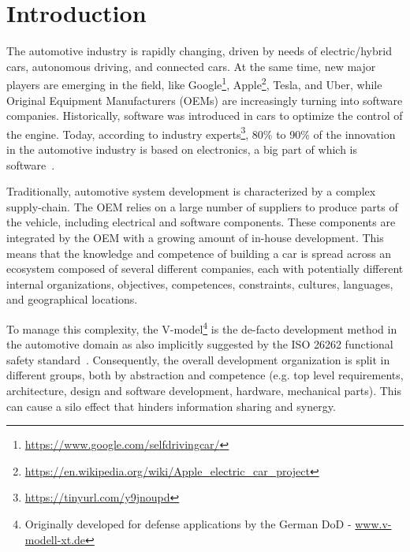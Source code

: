 \section{Introduction}\label{sec:intro}


The automotive industry is rapidly %
changing, driven by needs of 
electric/hybrid cars, autonomous driving, and connected cars. 
At the same time, new major players are emerging in the field, like Google\footnote{\url{https://www.google.com/selfdrivingcar/}},  %
Apple\footnote{\url{https://en.wikipedia.org/wiki/Apple_electric_car_project}}, %
 Tesla, and Uber, while Original Equipment Manufacturers (OEMs) are increasingly turning into software companies. 
Historically, software was introduced in cars to optimize the control of the engine. 
Today, according to industry experts\footnote{\url{https://tinyurl.com/y9jnoupd}}, 80\% to 90\% of the innovation in the automotive industry is based on electronics, a big part of which is software~\cite{ESEM2016}. 

Traditionally, automotive system development is characterized by a complex supply-chain.
The OEM relies on a large number of suppliers to produce parts of the vehicle, including electrical and software components.
These components are integrated by the OEM with a growing amount of in-house development.
This means that the knowledge and competence of building a car is spread across an ecosystem composed of several different companies, each with potentially different internal organizations, objectives, competences, constraints, cultures, languages, and geographical locations. 

To manage this complexity, the V-model\footnote{Originally developed for defense applications by the German DoD - \url{www.v-modell-xt.de}} %
is the de-facto development method in the automotive domain as also implicitly suggested by the ISO 26262 functional safety standard~\cite{iso26262}.
Consequently, the overall development organization is split in different groups, both by abstraction and competence (e.g. top level requirements,
architecture, design and software development, hardware, mechanical parts). %
This can cause a silo effect that hinders information sharing and synergy. %


